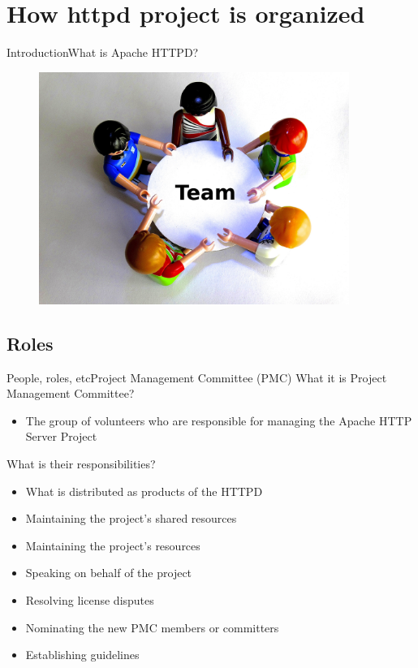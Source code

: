 \documentclass[10pt]{beamer}
\begin{document}
\section{How httpd project is organized}
\begin{frame}{Introduction}{What is Apache HTTPD?}
  \begin{figure}[ht]
    \centering
    \includegraphics[width=0.9\textwidth, keepaspectratio=true]{images/roles.jpg}
  \end{figure}
\end{frame}

\subsection{Roles}
\begin{frame}{People, roles, etc}{Project Management Committee (PMC)}
  What it is Project Management Committee? \pause
  \begin{itemize}
    \item The group of volunteers who are responsible for managing the Apache
          HTTP Server Project \pause
  \end{itemize}

  What is their responsibilities? \pause
  \begin{itemize}
    \item What is distributed as products of the HTTPD \pause
    \item Maintaining the project's shared resources \pause
    \item Maintaining the project's resources \pause
    \item Speaking on behalf of the project \pause
    \item Resolving license disputes \pause
    \item Nominating the new PMC members or committers \pause
    \item Establishing guidelines
  \end{itemize}
\end{frame}
\end{document}
